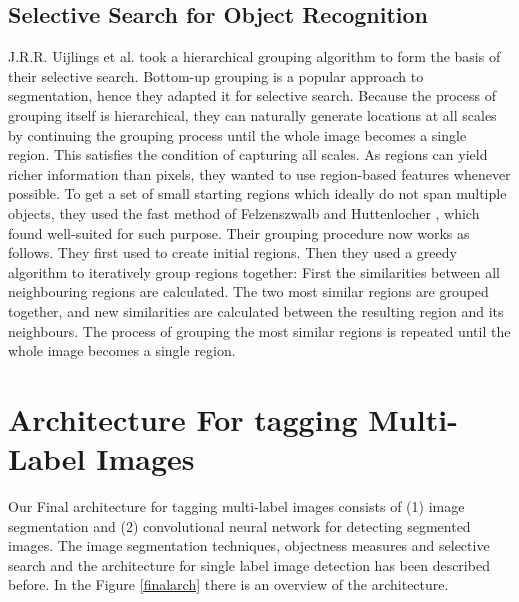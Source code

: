 \subsection{Selective Search for Object Recognition}


J.R.R. Uijlings et al. \cite{2} took a hierarchical grouping algorithm to form the basis of their
selective search. Bottom-up grouping is a popular approach to segmentation, hence they adapted it for selective search. Because
the process of grouping itself is hierarchical, they can naturally generate locations at all scales by continuing the grouping process until
the whole image becomes a single region. This satisfies the condition of capturing all scales.
As regions can yield richer information than pixels, they wanted to
use region-based features whenever possible. To get a set of small
starting regions which ideally do not span multiple objects, they used the fast method of Felzenszwalb and Huttenlocher \cite{7}, which
found well-suited for such purpose.
Their grouping procedure now works as follows. They first used \cite{7}
to create initial regions. Then they used a greedy algorithm to iteratively group regions together: First the similarities between all
neighbouring regions are calculated. The two most similar regions
are grouped together, and new similarities are calculated between
the resulting region and its neighbours. The process of grouping
the most similar regions is repeated until the whole image becomes
a single region.


\section{Architecture For tagging Multi-Label Images}

Our Final architecture for tagging multi-label images consists of (1) image segmentation and (2) convolutional neural network for detecting segmented images. The image segmentation techniques, objectness measures and selective search and the architecture for single label image detection has been described before. In the Figure \ref{finalarch} there is an overview of the architecture. \hfill \break


